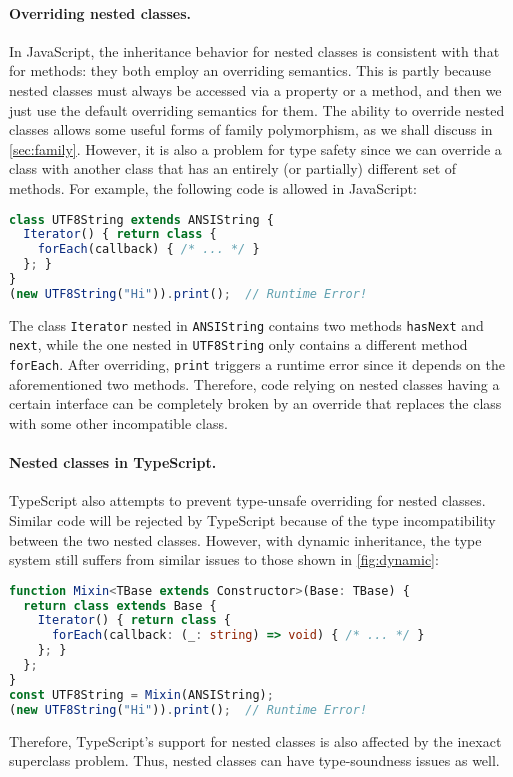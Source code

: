 \paragraph{Overriding nested classes.}
In JavaScript, the inheritance behavior for nested classes is consistent with
that for methods: they both employ an overriding semantics. This is partly
because nested classes must always be accessed via a property or a method, and
then we just use the default overriding semantics for them. The ability to
override nested classes allows some useful forms of family polymorphism, as we
shall discuss in \autoref{sec:family}. However, it is also a problem for type
safety since we can override a class with another class that has an entirely (or
partially) different set of methods. For example, the following code is allowed
in JavaScript:
\begin{lstlisting}[language=TypeScript]
class UTF8String extends ANSIString {
  Iterator() { return class {
    forEach(callback) { /* ... */ }
  }; }
}
(new UTF8String("Hi")).print();  // Runtime Error!
\end{lstlisting}
The class \lstinline{Iterator} nested in \lstinline{ANSIString} contains two
methods \lstinline{hasNext} and \lstinline{next}, while the one nested in
\lstinline{UTF8String} only contains a different method \lstinline{forEach}.
After overriding, \lstinline{print} triggers a runtime error since it depends on
the aforementioned two methods. Therefore, code relying on nested classes having
a certain interface can be completely broken by an override that replaces the
class with some other incompatible class.

\paragraph{Nested classes in TypeScript.}
TypeScript also attempts to prevent type-unsafe overriding for nested classes.
Similar code will be rejected by TypeScript because of the type incompatibility
between the two nested classes. However, with dynamic inheritance, the type
system still suffers from similar issues to those shown in
\autoref{fig:dynamic}:
\begin{lstlisting}[language=TypeScript]
function Mixin<TBase extends Constructor>(Base: TBase) {
  return class extends Base {
    Iterator() { return class {
      forEach(callback: (_: string) => void) { /* ... */ }
    }; }
  };
}
const UTF8String = Mixin(ANSIString);
(new UTF8String("Hi")).print();  // Runtime Error!
\end{lstlisting}
\noindent Therefore, TypeScript's support for nested classes is also affected by
the inexact superclass problem. Thus, nested classes can have type-soundness
issues as well.

